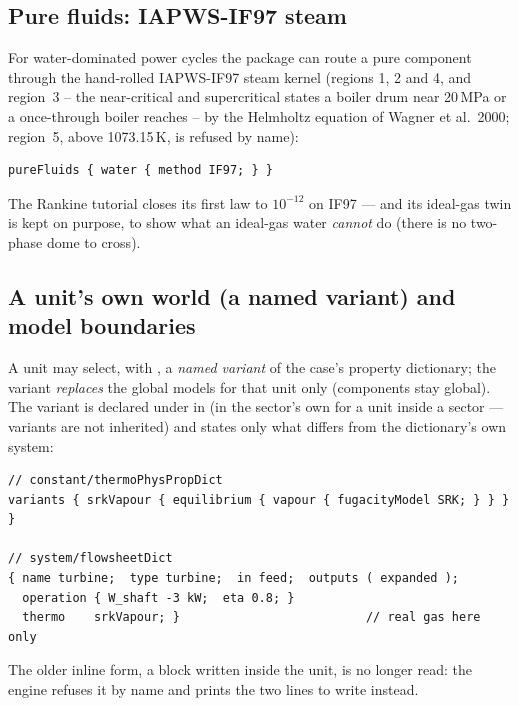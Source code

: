\documentclass[11pt,a4paper]{article}
\begin{document}
\subsection{Pure fluids: IAPWS-IF97 steam}

For water-dominated power cycles the package can route a pure component
through the hand-rolled IAPWS-IF97 steam kernel (regions 1, 2 and 4, and
region~3 -- the near-critical and supercritical states a boiler drum near
20\,MPa or a once-through boiler reaches -- by the Helmholtz equation of
Wagner et al.\ 2000; region~5, above 1073.15\,K, is refused by name):

\begin{lstlisting}[language=dict]
pureFluids { water { method IF97; } }
\end{lstlisting}

The Rankine tutorial 
closes its first law to $10^{-12}$ on IF97 --- and its ideal-gas twin
 is kept on purpose, to show what an ideal-gas
water \emph{cannot} do (there is no two-phase dome to cross).

\subsection{A unit's own world (a named variant) and model boundaries}\label{sec:thermo-override}

A unit may select, with , a \emph{named variant} of the
case's property dictionary; the variant \emph{replaces} the global models for
that unit only (components stay global).  The variant is declared under
 in  (in the sector's own
 for a unit inside a sector --- variants are
not inherited) and states only what differs from the dictionary's own system:

\begin{lstlisting}[language=dict]
// constant/thermoPhysPropDict
variants { srkVapour { equilibrium { vapour { fugacityModel SRK; } } } }

// system/flowsheetDict
{ name turbine;  type turbine;  in feed;  outputs ( expanded );
  operation { W_shaft -3 kW;  eta 0.8; }
  thermo    srkVapour; }                          // real gas here only
\end{lstlisting}

The older inline form, a  block written inside the unit,
is no longer read: the engine refuses it by name and prints the two lines to
write instead.
\end{document}
